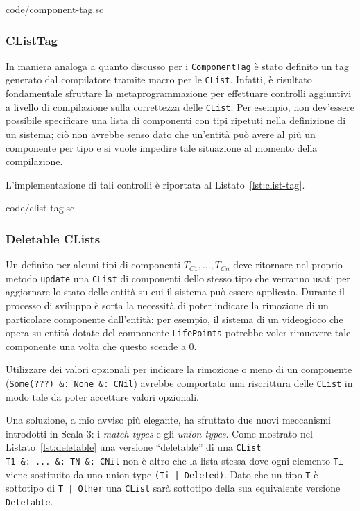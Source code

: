 
{code/component-tag.sc}

\subsubsection{CListTag}
In maniera analoga a quanto discusso per i \texttt{ComponentTag} è stato definito un tag generato dal
compilatore tramite macro per le \texttt{CList}.
Infatti, è risultato fondamentale sfruttare la metaprogrammazione per effettuare controlli aggiuntivi
a livello di compilazione sulla correttezza delle \texttt{CList}.
Per esempio, non dev'essere possibile specificare una lista di
componenti con tipi ripetuti nella definizione di un sistema; ciò non avrebbe
senso dato che un'entità può avere al più un componente per tipo e si vuole impedire tale situazione
al momento della compilazione.

L'implementazione di tali controlli è riportata al Listato~\ref{lst:clist-tag}.

{code/clist-tag.sc}

\subsubsection{Deletable CLists}\label{sub:deletable}
Un \System definito per alcuni tipi di componenti $T_{C1},\dots,T_{Cn}$ deve ritornare nel proprio metodo
\texttt{update} una \texttt{CList} di componenti dello stesso tipo che verranno usati per aggiornare lo stato
delle entità su cui il sistema può essere applicato.
Durante il processo di sviluppo è sorta la necessità di poter indicare la rimozione di un particolare componente
dall'entità: per esempio, il sistema di un videogioco che opera su entità dotate del componente \texttt{LifePoints}
potrebbe voler rimuovere tale componente una volta che questo scende a 0.

Utilizzare dei valori opzionali per indicare la rimozione o meno di un componente
(\eg \texttt{Some(???)~\&:~None~\&:~CNil}) avrebbe comportato una
riscrittura delle \texttt{CList} in modo tale da poter accettare valori opzionali.

Una soluzione, a mio avviso più elegante, ha sfruttato due nuovi meccanismi introdotti in Scala 3:
i \textit{match types}\cite{match-types} e gli \textit{union types}\cite{union-types}.
Come mostrato nel Listato~\ref{lst:deletable} una versione ``deletable'' di una \texttt{CList}
\texttt{T1~\&:~...~\&:~TN~\&:~CNil} non è altro
che la lista stessa dove ogni elemento \texttt{Ti} viene sostituito da uno union type \texttt{(Ti | Deleted)}.
Dato che un tipo \texttt{T} è sottotipo di \texttt{T | Other} una \texttt{CList} sarà sottotipo della sua
equivalente versione \texttt{Deletable}.

